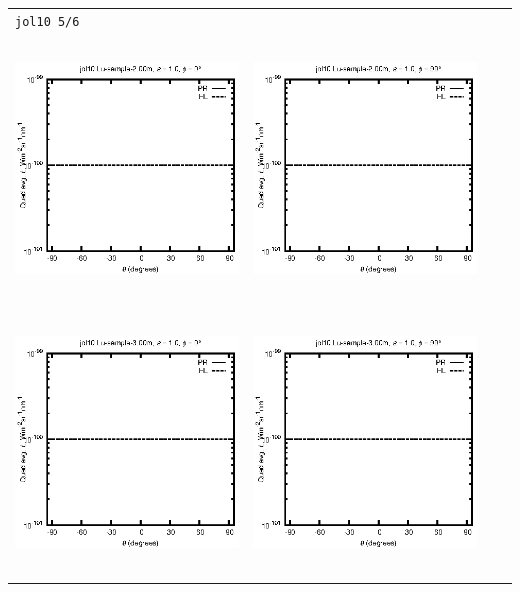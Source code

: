 \begin{tabular}{c c c c}
\multicolumn{4}{l}{\texttt{jol10 5/6}} \\
\includegraphics[height=7cm]{../eps/jol10_Lu_sample_2.00m_fwd.eps} &
\includegraphics[height=7cm]{../eps/jol10_Lu_sample_2.00m_cross.eps} \\
\includegraphics[height=7cm]{../eps/jol10_Lu_sample_3.00m_fwd.eps} &
\includegraphics[height=7cm]{../eps/jol10_Lu_sample_3.00m_cross.eps} \\

\end{tabular}
